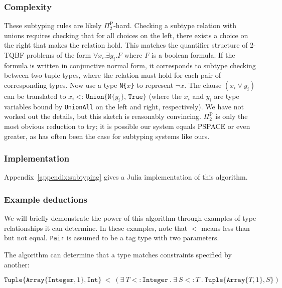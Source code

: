 
\subsubsection{Complexity}

These subtyping rules are likely $\Pi_2^{\textrm{P}}$-hard.
Checking a subtype relation with unions requires checking that for all choices
on the left, there exists a choice on the right that makes the relation hold.
This matches the quantifier structure of 2-TQBF problems of the form
$\forall x_i . \exists y_i . F$ where $F$ is a boolean formula. If the formula
is written in conjunctive normal form, it corresponds to subtype checking
between two tuple types, where the relation must hold for each pair of
corresponding types. Now use a type \texttt{N\{}$x$\texttt{\}} to
represent $\neg x$. The clause $(x_i \vee y_i)$ can be translated to
$x_i\ \texttt{<:\ Union\{N\{}y_i\texttt{\}, True\}}$ (where the $x_i$ and
$y_i$ are type variables bound by \texttt{UnionAll} on the left and right,
respectively).
We have not worked out the details, but this sketch is reasonably
convincing. $\Pi_2^{\textrm{P}}$ is only the most obvious
reduction to try; it is possible our system equals PSPACE or even greater,
as has often been the case for subtyping systems like ours.

\subsubsection{Implementation}

Appendix~\ref{appendix:subtyping} gives a Julia implementation of this
algorithm.

\subsubsection{Example deductions}

We will briefly demonstrate the power of this algorithm through examples of
type relationships it can determine.
In these examples, note that $<$ means less than but not equal.
\texttt{Pair} is assumed to be a tag type with two parameters.

\noindent
The algorithm can determine that a type matches constraints specified by another:

\vspace{-5ex}
\[
\texttt{Tuple}\{\texttt{Array}\{\texttt{Integer},1\}, \texttt{Int}\}\ <\ 
  (\exists\ T<:\texttt{Integer}\ .\ \exists\ S<:T\ .\ \texttt{Tuple}\{\texttt{Array}\{T,1\},S\})
\]


